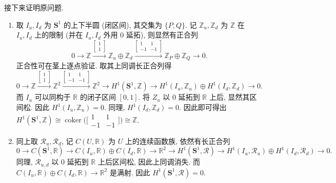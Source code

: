 \documentclass{article}
\theoremstyle{exercise}
\theoremstyle{plain}
\theoremstyle{remark}
\newenvironment{proofc}{\proof}{\endproof}
\def\Z{\mathbb{Z}}
\def\R{\mathbb{R}}
\def\bS{\mathbf{S}}
\def\sR{\mathscr{R}}
\def\coker{\operatorname{coker}}
\begin{document}
\begin{proofc}
  接下来证明原问题.
  \begin{enumerate}[label=(\arabic*)]
    \item 取 $I_u, I_d$ 为 $\bS^1$ 的上下半圆 (闭区间), 其交集为 $\{P, Q\}$.
          记 $\Z_u, \Z_d$ 为 $\Z$ 在 $I_u, I_d$ 上的限制 (并在 $I_u, I_d$ 外用 $0$ 延拓), 则显然有正合列
          \[
          0 \to \Z \xrightarrow{\begin{bmatrix} 1 \\ 1 \end{bmatrix}} \Z_u \oplus \Z_d \xrightarrow{\begin{bmatrix} 1 & 1 \\ -1 & -1 \end{bmatrix}} \Z_P \oplus \Z_Q \to 0.
          \]
          正合性可在茎上逐点验证. 取其上同调长正合列得
          \[
          0 \to \Z \xrightarrow{\begin{bmatrix} 1 \\ 1 \end{bmatrix}} \Z^2 \xrightarrow{\begin{bmatrix} 1 & 1 \\ -1 & -1 \end{bmatrix}} \Z^2
          \to H^1(\bS^1, \Z) \to H^1(I_u, \Z_u) \oplus H^1(I_d, \Z_d) \to 0.
          \]
          而 $I_u$ 可以同构于 $\R$ 的闭子区间 $[0, 1]$. 将 $Z_u$ 以 $0$ 延拓到 $\R$ 上后, 显然其区间松. 因此 $H^1(I_u, \Z_u) = 0$.
          同理, $H^1(I_d, \Z_d) = 0$. 因此即可得出 $H^1(\bS^1, \Z) \cong \coker\bigl(\bigl[\begin{smallmatrix} 1 & 1 \\ -1 & -1 \end{smallmatrix}\bigr]\bigr) \cong \Z$.
    \item 同上取 $\sR_u, \sR_d$, 记 $C(U, \R)$ 为 $U$ 上的连续函数族, 依然有长正合列
          \[
          0 \to C(\bS^1, \R) \to C(I_u, \R) \oplus C(I_d, \R) \to \R^2
          \to H^1(\bS^1, \sR) \to H^1(I_u, \sR_u) \oplus H^1(I_d, \sR_d) \to 0.
          \]
          同理, $\sR_{u, d}$ 以 $0$ 延拓到 $\R$ 上后区间松, 因此上同调消失. 而 $C(I_u, \R) \oplus C(I_d, \R) \to \R^2$ 是满射.
          因此 $H^1(\bS^1, \sR) = 0$. \qedhere
  \end{enumerate}
\end{proofc}
\end{document}
